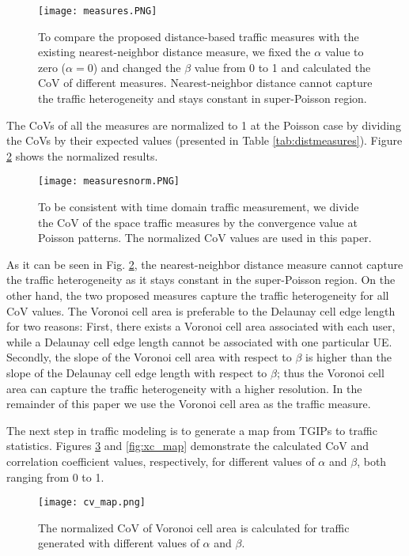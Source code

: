 \documentclass[journal]{IEEEtran}
\begin{document}
\begin{figure}
\centering
\texttt{[image: measures.PNG]}
\caption{To compare the proposed distance-based traffic measures with the existing nearest-neighbor distance measure, we fixed the $\alpha$ value to zero ($\alpha=0$) and changed the $\beta$ value from 0 to 1 and calculated the CoV of different measures. Nearest-neighbor distance cannot capture the traffic heterogeneity and stays constant in super-Poisson region.}
\label{fig:measures}
\end{figure}

The CoVs of all the measures are normalized to 1 at the Poisson case by dividing the CoVs by their expected values (presented in Table \ref{tab:distmeasures}). Figure \ref{fig:measuresnorm} shows the normalized results.

\begin{figure}
\centering
\texttt{[image: measuresnorm.PNG]}
\caption{To be consistent with time domain traffic measurement, we divide the CoV of the space traffic measures by the convergence value at Poisson patterns. The normalized CoV values are used in this paper.}
\label{fig:measuresnorm}
\end{figure}

As it can be seen in Fig. \ref{fig:measuresnorm}, the nearest-neighbor distance measure cannot capture the traffic heterogeneity as it stays constant in the super-Poisson region. On the other hand, the two proposed measures capture the traffic heterogeneity for all CoV values. The Voronoi cell area is preferable to the Delaunay cell edge length for two reasons: First, there exists a Voronoi cell area associated with each user, while a Delaunay cell edge length cannot be associated with one particular UE. Secondly, the slope of the Voronoi cell area with respect to $\beta$ is higher than the slope of the Delaunay cell edge length with respect to $\beta$; thus the Voronoi cell area can capture the traffic heterogeneity with a higher resolution. In the remainder of this paper we use the Voronoi cell area as the traffic measure.

The next step in traffic modeling is to generate a map from TGIPs to traffic statistics. Figures \ref{fig:cv_map} and \ref{fig:xc_map} demonstrate the calculated CoV and correlation coefficient values, respectively, for different values of $\alpha$ and $\beta$, both ranging from 0 to 1.

\begin{figure}
\centering
\texttt{[image: cv\_map.png]}
\caption{The normalized CoV of Voronoi cell area is calculated for traffic generated with different values of $\alpha$ and $\beta$.}
\label{fig:cv_map}
\end{figure}
\end{document}
